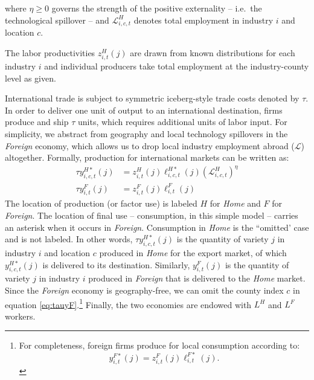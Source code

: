 \documentclass[onehalfspacing,11pt]{article}
\begin{document}
where $\eta \geq 0$ governs the strength of the positive externality -- i.e.~the technological spillover -- and $\mathcal{L}_{i,c,t}^H$ denotes total employment in industry $i$ and location $c$. 

The labor productivities $z_{i,t}^H(j)$ are drawn from known distributions for each industry $i$ and individual producers take total employment at the industry-county level as given.

International trade is subject to symmetric iceberg-style trade costs denoted by $\tau$. In order to deliver one unit of output to an international destination, firms produce and ship $\tau$ units, which requires additional units of labor input. For simplicity, we abstract from geography and local technology spillovers in the {\it Foreign} economy, which allows us to drop local industry employment abroad ($\mathcal{L}$) altogether. Formally, production for international markets can be written as:
\begin{align}
\label{}
\tau y_{i,c,t}^{H*}(j) & = z_{i,t}^H(j) \ell_{i,c,t}^{H*}(j) \left( \mathcal{L}_{i,c,t}^H \right)^\eta\\
\tau y_{i,t}^{F}(j) & = z_{i,t}^F(j) \ell_{i,t}^{F}(j) \label{eq:tauyF}
\end{align}
The location of production (or factor use) is labeled $H$ for {\it Home} and $F$ for {\it Foreign}. The location of final use -- consumption, in this simple model -- carries an asterisk when it occurs in {\it Foreign}. Consumption in {\it Home} is the ``omitted' case and is not labeled. In other words, $\tau y_{i,c,t}^{H*}(j)$ is the quantity of variety $j$ in industry $i$ and location $c$ produced in {\it Home} for the export market, of which $y_{i,c,t}^{H*}(j)$ is delivered to its destination. Similarly, $y_{i,t}^{F}(j)$ is the quantity of variety $j$ in industry $i$ produced in {\it Foreign} that is delivered to the {\it Home} market. Since the {\it Foreign} economy is geography-free, we can omit the county index $c$ in equation \eqref{eq:tauyF}.\footnote{For completeness, foreign firms produce for local consumption according to:
\begin{equation}
\label{ }
y_{i,t}^{F*}(j) = z_{i,t}^F(j) \ell_{i,t}^{F*}(j) .
\end{equation}}
Finally, the two economies are endowed with $L^H$ and $L^F$ workers. 
\end{document}
